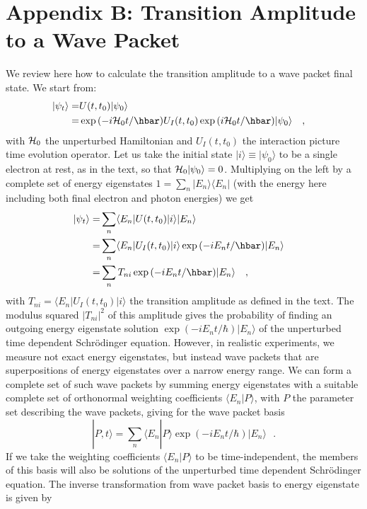 \documentclass[12pt,onecolumn,amssymb,nofootinbib]{revtex4-2} %
\begin{document}
\section*{Appendix B: Transition Amplitude to a Wave Packet}

We review here how to calculate the transition amplitude to a wave packet final state.
We start from:
\begin{align}\label{eq:gentime}
|\psi_t\rangle  =& U(t,t_0) |\psi_0\rangle  \cr
=& \exp{(-i{\cal H}_0 t/\hbar)} U_I(t,t_0) \exp{(i{\cal H}_0 t/\hbar)} |\psi_0\rangle~~~,  \cr
\end{align}
with ${\cal H}_0$ the unperturbed Hamiltonian and $U_I(t,t_0)$ the interaction picture
time evolution operator.  Let us take the initial state $|i\rangle \equiv|\psi_0\rangle$ to be a single
electron at rest, as in the text, so that ${\cal H}_0 |\psi_0\rangle =0$. Multiplying on the left by a
complete set of energy eigenstates $1=\sum_n |E_n\rangle \langle E_n|$ (with the energy here including
both final electron and photon energies) we get
\begin{align}\label{eq:gentime1}
|\psi_t\rangle  =&\sum_n \langle E_n| U(t,t_0) |i\rangle | E_n \rangle\cr
=&\sum_n \langle E_n|  U_I(t,t_0)|i \rangle \exp{(-i E_n t/\hbar)}|E_n \rangle   \cr
=&\sum_n T_{ni} \exp{(-i E_n t/\hbar)}|E_n \rangle ~~~,  \cr
\end{align}
with $T_{ni}=\langle E_n|  U_I(t,t_0)|i \rangle$ the transition amplitude as defined in the text.  The modulus squared $|T_{ni}|^2$
of this amplitude gives the probability of finding an outgoing energy
eigenstate  solution $\exp{(-i E_n t/\hbar)}|E_n \rangle$ of the unperturbed time dependent Schr\"odinger equation.
However, in realistic experiments, we measure not exact energy eigenstates, but instead wave packets
that are superpositions of energy eigenstates over a narrow energy range.  We can form a complete set of
such wave packets by summing energy eigenstates with a suitable complete set of orthonormal weighting coefficients
$\langle E_n| P\rangle$, with $P$ the parameter set describing the wave packets,  giving for the wave packet basis
\begin{equation}\label{eq:wavebasis}
|P,t\rangle = \sum_n  \langle E_n| P\rangle  \exp{(-i E_n t/\hbar)}|E_n \rangle ~~~.
\end{equation}
If we take the weighting coefficients $ \langle E_n| P\rangle $ to be time-independent, the members of this basis
will also be solutions of the unperturbed time dependent Schr\"odinger equation. The inverse
transformation from wave packet basis to energy eigenstate is given by
\end{document}

